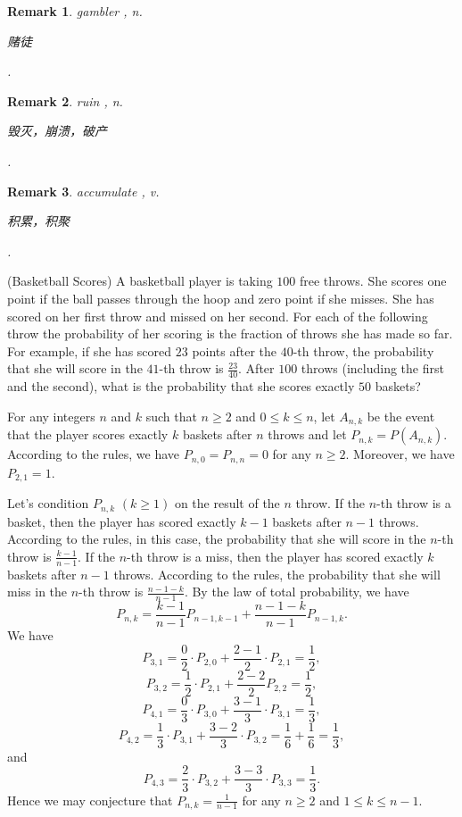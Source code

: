 \documentclass[12pt,letterpaper, onecolumn]{exam}
\newtheorem{remark}{Remark}
\begin{document}
\begin{questions}
\begin{solution}
\end{solution}
\begin{remark}
    gambler , n. \begin{CJK}{UTF8}{gbsn}赌徒\end{CJK}.
\end{remark}
\begin{remark}
    ruin , n. \begin{CJK}{UTF8}{gbsn}毁灭，崩溃，破产\end{CJK}.
\end{remark}
\begin{remark}
    accumulate , v. \begin{CJK}{UTF8}{gbsn}积累，积聚\end{CJK}.
\end{remark}

\question[](Basketball Scores) A basketball player is taking $100$ free throws. She scores one point if the ball passes through the hoop and zero point if she misses. She has scored on her first throw and missed on her second. For each of the following throw the probability of her scoring is the fraction of throws she has made so far. For example, if she has scored $23$ points after the $40$-th throw, the probability that she will score in the $41$-th throw is $\frac{23}{40}$. After $100$ throws (including the first and the second), what is the probability that she scores exactly $50$ baskets?
\begin{solution}
    For any integers $n$ and $k$ such that $n\ge 2$ and $0\le k\le n$, let $A_{n,k}$ be the event that the player scores exactly $k$ baskets after $n$ throws and let $P_{n,k}=P(A_{n,k})$. According to the rules, we have $P_{n,0}=P_{n,n}=0$ for any $n\ge 2$. Moreover, we have $P_{2,1}=1$.
    
    \quad Let's condition $P_{n,k}$ $(k\ge 1)$ on the result of the $n$ throw. If the $n$-th throw is a basket, then the player has scored exactly $k-1$ baskets after $n-1$ throws. According to the rules, in this case, the probability that she will score in the $n$-th throw is $\frac{k-1}{n-1}$. If the $n$-th throw is a miss, then the player has scored exactly $k$ baskets after $n-1$ throws. According to the rules, the probability that she will miss in the $n$-th throw is $\frac{n-1-k}{n-1}$. By the law of total probability, we have
    $$P_{n,k}=\frac{k-1}{n-1}P_{n-1,k-1}+\frac{n-1-k}{n-1}P_{n-1,k}.$$
    \quad We have 
    $$P_{3,1}=\frac{0}{2}\cdot P_{2,0}+\frac{2-1}{2}\cdot P_{2,1}=\frac{1}{2},$$
    $$P_{3,2}=\frac{1}{2}\cdot P_{2,1}+\frac{2-2}{2}P_{2,2}=\frac{1}{2},$$
    $$P_{4,1}=\frac{0}{3}\cdot P_{3,0}+\frac{3-1}{3}\cdot P_{3,1}=\frac{1}{3},$$
    $$P_{4,2}=\frac{1}{3}\cdot P_{3,1}+\frac{3-2}{3}\cdot P_{3,2}=\frac{1}{6}+\frac{1}{6}=\frac{1}{3},$$
    and 
    $$P_{4,3}=\frac{2}{3}\cdot P_{3,2}+\frac{3-3}{3}\cdot P_{3,3}=\frac{1}{3}.$$
    Hence we may conjecture that $P_{n,k}=\frac{1}{n-1}$ for any $n\ge 2$ and $1\le k\le n-1$.


\end{solution}
\end{questions}
\end{document}
